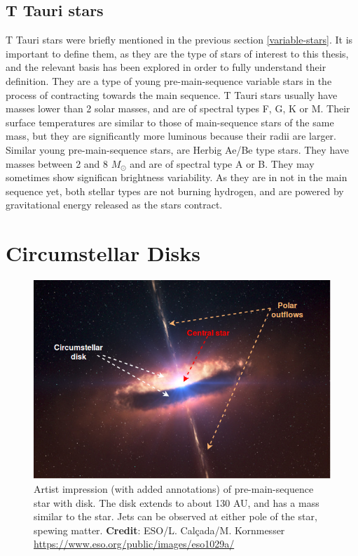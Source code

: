 \subsection{T Tauri stars}

T Tauri stars were briefly mentioned in the previous section \ref{variable-stars}. It is important to define them, as they are the type of stars of interest to this thesis, and the relevant basis has been explored in order to fully understand their definition. They are a type of young pre-main-sequence variable stars in the process of contracting towards the main sequence. T Tauri stars usually have masses lower than 2 solar masses, and are of spectral types F, G, K or M. Their surface temperatures are similar to those of main-sequence stars of the same mass, but they are significantly more luminous because their radii are larger. Similar young pre-main-sequence stars, are Herbig Ae/Be type stars. They have masses between 2 and 8 $M_{\odot}$ and are of spectral type A or B. They may sometimes show significan brightness variability. As they are in not in the main sequence yet, both stellar types are not burning hydrogen, and are powered by gravitational energy released as the stars contract.


\section{Circumstellar Disks}

\begin{figure}[hbt!]
		\centering
		\includegraphics[width=\textwidth]{img/circumstellar-disk-eso1029a}%
  		\caption{Artist impression (with added annotations) of pre-main-sequence star with disk. The disk extends to about 130 AU, and has a mass similar to the star. Jets can be observed at either pole of the star, spewing matter. \textbf{Credit}: ESO/L. Calçada/M. Kornmesser \url{https://www.eso.org/public/images/eso1029a/}}
  		\label{fig:schema}
\end{figure}

